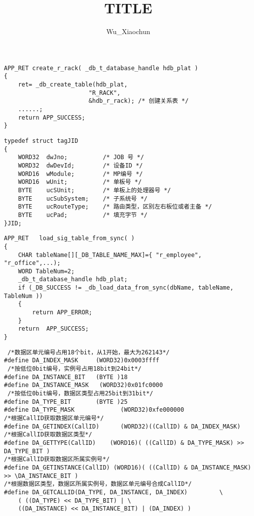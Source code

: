 ﻿\documentclass[12pt,a4paper,onecolumn]{article}
\title{TITLE}
\author{Wu_Xiaochun}
\date{}
\begin{document}
\begin{footnotesize}
\begin{lstlisting}
APP_RET create_r_rack( _db_t_database_handle hdb_plat )
{
    ret= _db_create_table(hdb_plat,
                        "R_RACK",
                        &hdb_r_rack); /* 创建关系表 */
    ......;
    return APP_SUCCESS;
}
\end{lstlisting}
\end{footnotesize}

\begin{footnotesize}
\begin{lstlisting}
typedef struct tagJID
{
    WORD32  dwJno;          /* JOB 号 */
    WORD32  dwDevId;        /* 设备ID */
    WORD16  wModule;        /* MP编号 */
    WORD16  wUnit;          /* 单板号 */
    BYTE    ucSUnit;        /* 单板上的处理器号 */
    BYTE    ucSubSystem;    /* 子系统号 */
    BYTE    ucRouteType;    /* 路由类型，区别左右板位或者主备 */
    BYTE    ucPad;          /* 填充字节 */
}JID;
\end{lstlisting}
\end{footnotesize}

\begin{footnotesize}
\begin{lstlisting}
APP_RET   load_sig_table_from_sync( )
{
    CHAR tableName[][_DB_TABLE_NAME_MAX]={ "r_employee", "r_office",...);
    WORD TableNum=2;
    _db_t_database_handle hdb_plat;
    if (_DB_SUCCESS != _db_load_data_from_sync(dbName, tableName, TableNum ))
    {
        return APP_ERROR;
    }
    return  APP_SUCCESS;
}
\end{lstlisting}
\end{footnotesize}
\pagebreak
\begin{footnotesize}
\begin{lstlisting}
 /*数据区单元编号占用18个bit，从1开始，最大为262143*/
#define DA_INDEX_MASK     (WORD32)0x0003ffff
 /*按低位0bit编号，实例号占用18bit到24bit*/
#define DA_INSTANCE_BIT   (BYTE )18
#define DA_INSTANCE_MASK   (WORD32)0x01fc0000    
 /*按低位0bit编号，数据区类型占用25bit到31bit*/
#define DA_TYPE_BIT       (BYTE )25
#define DA_TYPE_MASK             (WORD32)0xfe000000
/*根据CallID获取数据区单元编号*/
#define DA_GETINDEX(CallID)      (WORD32)((CallID) & DA_INDEX_MASK)
/*根据CallID获取数据区类型*/
#define DA_GETTYPE(CallID)    (WORD16)( ((CallID) & DA_TYPE_MASK) >> DA_TYPE_BIT )
/*根据CallID获取数据区所属实例号*/
#define DA_GETINSTANCE(CallID) (WORD16)( ((CallID) & DA_INSTANCE_MASK) >> \DA_INSTANCE_BIT )
/*根据数据区类型，数据区所属实例号，数据区单元编号合成CallID*/
#define DA_GETCALLID(DA_TYPE, DA_INSTANCE, DA_INDEX)         \
    ( ((DA_TYPE) << DA_TYPE_BIT) | \
    ((DA_INSTANCE) << DA_INSTANCE_BIT) | (DA_INDEX) )
\end{lstlisting}
\end{footnotesize}
\end{document}
